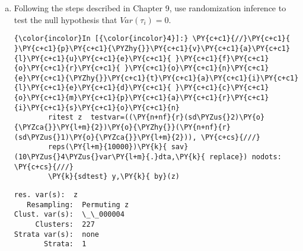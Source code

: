 \documentclass[11pt,notitlepage]{article}\usepackage[]{graphicx}\usepackage[]{color}
\makeatletter
\newenvironment{kframe}{%
 \def\at@end@of@kframe{}%
 \ifinner\ifhmode%
  \def\at@end@of@kframe{\end{minipage}}%
  \begin{minipage}{\columnwidth}%
 \fi\fi%
 \def\FrameCommand##1{\hskip\@totalleftmargin \hskip-\fboxsep
 \colorbox{shadecolor}{##1}\hskip-\fboxsep
     \hskip-\linewidth \hskip-\@totalleftmargin \hskip\columnwidth}%
 \MakeFramed {\advance\hsize-\width
   \@totalleftmargin\z@ \linewidth\hsize
   \@setminipage}}%
 {\par\unskip\endMakeFramed%
 \at@end@of@kframe}
\newenvironment{knitrout}{}{} %
\makeatother
\begin{document}
\begin{enumerate}[a)]
\begin{knitrout}
\begin{kframe}
    \begin{Verbatim}[commandchars=\\\{\}]
{\color{incolor}In [{\color{incolor}3}]:} \PY{c+c1}{//}\PY{c+c1}{ }\PY{c+c1}{p}\PY{c+c1}{\PYZhy{}}\PY{c+c1}{v}\PY{c+c1}{a}\PY{c+c1}{l}\PY{c+c1}{u}\PY{c+c1}{e}\PY{c+c1}{ }\PY{c+c1}{t}\PY{c+c1}{w}\PY{c+c1}{o}\PY{c+c1}{\PYZhy{}}\PY{c+c1}{s}\PY{c+c1}{i}\PY{c+c1}{d}\PY{c+c1}{e}\PY{c+c1}{d}
        \PY{k}{ di} \PY{n+nFormat}{\PYZpc{}8.4f} \PY{n+nf}{el}(\PY{n+nf}{r}(p), \PY{l+m}{1}, \PY{l+m}{1})
\end{Verbatim}

    \begin{Verbatim}[commandchars=\\\{\}]
  0.5720

    \end{Verbatim}
\end{kframe}
\end{knitrout}

\item Following the steps described in Chapter 9, use randomization inference to test the null hypothesis that $Var(\tau_i) = 0$.

\begin{knitrout}
\color{fgcolor}\begin{kframe}
   \begin{Verbatim}[commandchars=\\\{\}]
{\color{incolor}In [{\color{incolor}4}]:} \PY{c+c1}{//}\PY{c+c1}{ }\PY{c+c1}{p}\PY{c+c1}{\PYZhy{}}\PY{c+c1}{v}\PY{c+c1}{a}\PY{c+c1}{l}\PY{c+c1}{u}\PY{c+c1}{e}\PY{c+c1}{ }\PY{c+c1}{f}\PY{c+c1}{o}\PY{c+c1}{r}\PY{c+c1}{ }\PY{c+c1}{o}\PY{c+c1}{n}\PY{c+c1}{e}\PY{c+c1}{\PYZhy{}}\PY{c+c1}{t}\PY{c+c1}{a}\PY{c+c1}{i}\PY{c+c1}{l}\PY{c+c1}{e}\PY{c+c1}{d}\PY{c+c1}{ }\PY{c+c1}{c}\PY{c+c1}{o}\PY{c+c1}{m}\PY{c+c1}{p}\PY{c+c1}{a}\PY{c+c1}{r}\PY{c+c1}{i}\PY{c+c1}{s}\PY{c+c1}{o}\PY{c+c1}{n}
        ritest z  testvar=((\PY{n+nf}{r}(sd\PYZus{}2)\PY{o}{\PYZca{}}\PY{l+m}{2})\PY{o}{\PYZhy{}}(\PY{n+nf}{r}(sd\PYZus{}1)\PY{o}{\PYZca{}}\PY{l+m}{2})), \PY{c+cs}{///}
        reps(\PY{l+m}{10000})\PY{k}{ sav}(10\PYZus{}4\PYZus{}var\PY{l+m}{.}dta,\PY{k}{ replace}) nodots: \PY{c+cs}{///}
        \PY{k}{sdtest} y,\PY{k}{ by}(z)
\end{Verbatim}

    \begin{Verbatim}[commandchars=\\\{\}]
  res. var(s):  z
   Resampling:  Permuting z
Clust. var(s):  \_\_000004
     Clusters:  227
Strata var(s):  none
       Strata:  1


\end{Verbatim}
\end{kframe}
\end{knitrout}
\end{enumerate}
\end{document}
